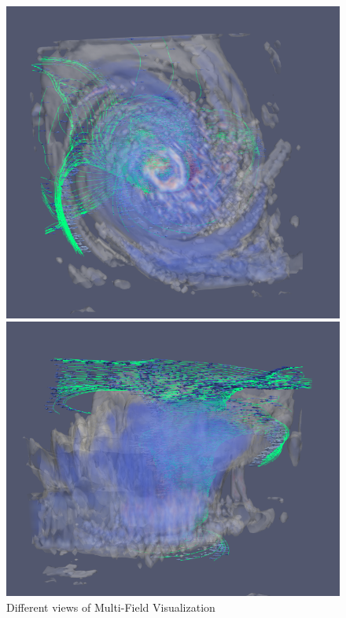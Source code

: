 \documentclass[a4paper,11pt]{article}
\theoremstyle{mytheor}
\begin{document}
\clearpage
\begin{figure}[!h]
    \centering
    \includegraphics[scale=0.6]{Figures/P3_3.PNG}
    
    \vspace{0.5 cm}
    \includegraphics[scale=0.6]{Figures/P3_4.PNG}
    \caption{Different views of Multi-Field Visualization}
    \label{p3_1}
\end{figure}
\end{document}
